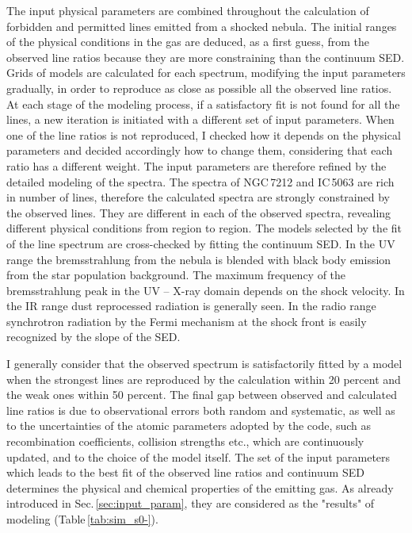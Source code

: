 \documentclass[../main.tex]{subfiles}
\begin{document}
The input physical parameters are combined throughout the calculation of forbidden and permitted lines emitted from a shocked nebula.
The initial ranges of the physical conditions in the gas are deduced, as a first guess, from the observed line ratios because they are more constraining than the continuum SED.
Grids of models are calculated for each spectrum, modifying the input parameters gradually, in order to reproduce as close as possible all the observed line ratios.
At each stage of the modeling process, if a satisfactory fit is not found for all the lines, a new iteration is initiated with a different set of input parameters. 
When one of the line ratios is not reproduced, I checked how it depends on the physical parameters and decided accordingly how to change them, considering that each ratio has a different weight.
The input parameters are therefore refined by the detailed modeling of the spectra.
The spectra of NGC\,7212 and IC\,5063 are rich in number of lines, therefore the calculated spectra are strongly constrained by the observed lines. 
They are different in each of the observed spectra, revealing different physical conditions from region to region. 
The models selected  by the fit of the line spectrum  are cross-checked by fitting the continuum SED.
In the UV range the bremsstrahlung from the nebula is blended with black body emission from the star population background. 
The maximum frequency of the bremsstrahlung peak in the UV -- X-ray domain depends on the shock velocity. 
In the IR range dust reprocessed radiation is generally seen.  
In the radio range synchrotron radiation by the Fermi mechanism at the shock front is easily recognized by the slope of the SED.


I generally consider that the observed spectrum is satisfactorily fitted by a model when the strongest lines are
reproduced by the calculation within 20 percent and the weak ones within 50 percent.
The final gap between observed and calculated line ratios is due to observational errors both random and systematic, as well as to the uncertainties of the atomic parameters  adopted by the code, such as recombination coefficients, collision strengths etc., which are continuously updated, and to the choice of the model itself.
The set of the input parameters which leads to the best fit of the observed line ratios and continuum SED determines the physical and chemical properties of the emitting gas. 
As already introduced in Sec.\,\ref{sec:input_param}, they are considered as the "results" of modeling (Table\,\ref{tab:sim_s0-}). 
\end{document}
